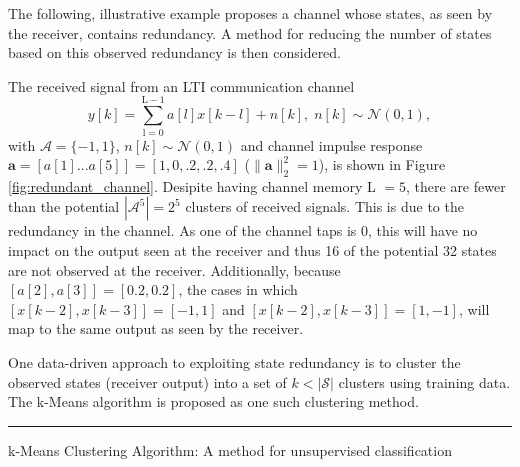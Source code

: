 The following, illustrative example proposes a channel whose states, as seen by the receiver, contains redundancy. A method for reducing the number of states based on this observed redundancy is then considered. 

The received signal from an LTI communication channel
\begin{equation*}
y[k] = \sum_{\mathrm{l=0}}^{\mathrm{L-1}} a[l]x[k-l] + n[k], \; n[k]  \sim \mathcal{N}(0,1),
\end{equation*}
with  $\mathcal{A}=\{-1, 1\}$, $n[k]  \sim \mathcal{N}(0,1)$ and 
channel impulse response $\mathbf{a} = [a[1]...a[5]]=[1, 0, .2, .2, .4]$ ($\|\mathbf{a}\|^2_2 = 1$),  is shown in Figure \ref{fig:redundant_channel}. Desipite having channel memory L $=5$, there are fewer than the potential $|\mathcal{A}^5| =2^5$ clusters of received signals. This is due to the redundancy in the channel.  As one of the channel taps is 0, this will have no impact on the output seen at the receiver and thus 16 of the potential 32 states are not observed at the receiver. Additionally, because $\left[a[2],a[3]\right] = \left[0.2, 0.2 \right] $, the cases in which  $\left[x[k-2],x[k-3]\right] = [-1,1]$ and $\left[x[k-2],x[k-3]\right] = [1,-1]$, will map to the same output as seen by the receiver. 


\par
One data-driven approach to exploiting state redundancy is to cluster the observed states (receiver output) into a set of $k<|\mathcal{S}|$ clusters using training data. The k-Means algorithm is proposed as one such clustering method.
\\

    \noindent\rule[16pt]{\textwidth}{0.6pt}
k-Means Clustering Algorithm: A method for unsupervised classification

